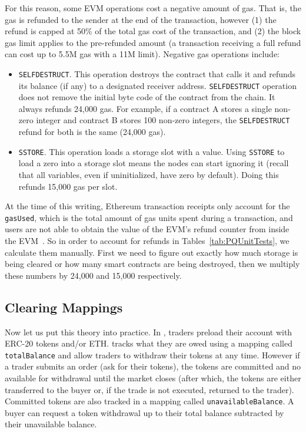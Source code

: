 For this reason, some EVM operations cost a negative amount of gas. That is, the gas is refunded to the sender at the end of the transaction, however (1) the refund is capped at 50\% of the total gas cost of the transaction, and (2) the block gas limit applies to the pre-refunded amount (\ie a transaction receiving a full refund can cost up to 5.5M gas with a 11M limit). Negative gas operations include:

\begin{itemize}

\item \texttt{SELFDESTRUCT}. This operation destroys the contract that calls it and refunds its balance (if any) to a designated receiver address. \texttt{SELFDESTRUCT} operation does not remove the initial byte code of the contract from the chain. It always refunds 24,000 gas. For example, if a contract A stores a single non-zero integer and contract B stores 100 non-zero integers, the \texttt{SELFDESTRUCT} refund for both is the same (24,000 gas).


\item \texttt{SSTORE}. This operation loads a storage slot with a value. Using \texttt{SSTORE} to load a zero into a storage slot means the nodes can start ignoring it (recall that all variables, even if uninitialized, have zero by default). Doing this refunds 15,000 gas per slot. 

\end{itemize} 

At the time of this writing, Ethereum transaction receipts only account for the \texttt{gasUsed}, which is the total amount of gas units spent during a transaction, and users are not able to obtain the value of the EVM's refund counter from inside the EVM~\cite{signer2018gas}. So in order to account for refunds in Tables~\ref{tab:PQUnitTests}, we calculate them manually. First we need to figure out exactly how much storage is being cleared or how many smart contracts are being destroyed, then we multiply these numbers by 24,000 and 15,000 respectively. 

\subsection{Clearing Mappings}

Now let us put this theory into practice. In \cm, traders preload their account with ERC-20 tokens and/or ETH. \cm tracks what they are owed using a mapping called \texttt{totalBalance} and allow traders to withdraw their tokens at any time. However if a trader submits an order (\ie ask for their tokens), the tokens are committed and no available for withdrawal until the market closes (after which, the tokens are either transferred to the buyer or, if the trade is not executed, returned to the trader). Committed tokens are also tracked in a mapping called \texttt{unavailableBalance}. A buyer can request a token withdrawal up to their total balance subtracted by their unavailable balance.

